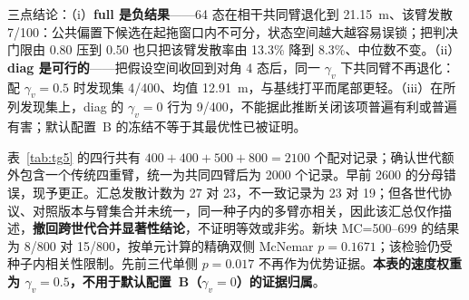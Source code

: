 \documentclass[UTF8,a4paper,zihao=-4]{ctexart}
\begin{document}
三点结论：（i）\textbf{full 是负结果}——64 态在相干共同臂退化到 21.15~m、该臂发散 7/100：公共偏置下候选在起拖窗口内不可分，状态空间越大越容易误锁；把判决门限由 0.80 压到 0.50 也只把该臂发散率由 13.3\% 降到 8.3\%、中位数不变。（ii）\textbf{diag 是可行的}——把假设空间收回到对角 4 态后，同一 $\gamma_v$ 下共同臂不再退化：配 $\gamma_v=0.5$ 时发现集 4/400、均值 12.91~m，与基线打平而尾部更轻。（iii）在所列发现集上，diag 的 $\gamma_v=0$ 行为 9/400，不能据此推断关闭该项普遍有利或普遍有害；默认配置~B 的冻结不等于其最优性已被证明。

\begin{table}[htbp]
\centering
\caption{元组 diag + 有限记忆 + $\gamma_v=0.5$ + pred（下称 \texttt{diag-tuple}）与基线 \texttt{combo+v} 的跨世代对照（同世代同种子配对）}\label{tab:tg5}
\small
{}
\end{table}

表~\ref{tab:tg5} 的四行共有 $400+400+500+800=2100$ 个配对记录；确认世代额外包含一个传统四重臂，统一为共同四臂后为 2000 个记录。早前 2600 的分母错误，现予更正。汇总发散计数为 27 对 23，不一致记录为 23 对 19；但各世代协议、对照版本与臂集合并未统一，同一种子内的多臂亦相关，因此该汇总仅作描述，\textbf{撤回跨世代合并显著性结论}，不证明等效或非劣。新块 MC=500--699 的结果为 8/800 对 15/800，按单元计算的精确双侧 McNemar $p=0.1671$；该检验仍受种子内相关性限制。先前三代单侧 $p=0.017$ 不再作为优势证据。\textbf{本表的速度权重为 $\gamma_v=0.5$，不用于默认配置~B（$\gamma_v=0$）的证据归属}。
\end{document}
